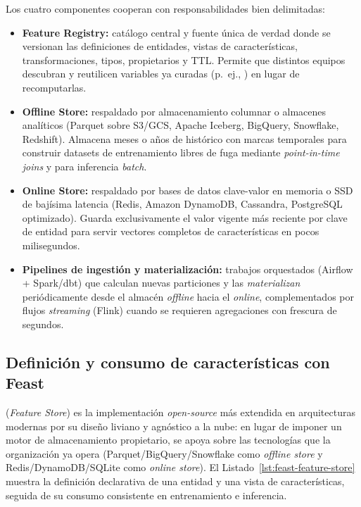 Los cuatro componentes cooperan con responsabilidades bien delimitadas:
\begin{itemize}
  \item \textbf{Feature Registry:} catálogo central y fuente única de verdad donde se versionan las definiciones de entidades, vistas de características, transformaciones, tipos, propietarios y TTL. Permite que distintos equipos descubran y reutilicen variables ya curadas (p.~ej., ) en lugar de recomputarlas.
  \item \textbf{Offline Store:} respaldado por almacenamiento columnar o almacenes analíticos (Parquet sobre S3/GCS, Apache Iceberg, BigQuery, Snowflake, Redshift). Almacena meses o años de histórico con marcas temporales para construir datasets de entrenamiento libres de fuga mediante \textit{point-in-time joins} y para inferencia \textit{batch}.
  \item \textbf{Online Store:} respaldado por bases de datos clave-valor en memoria o SSD de bajísima latencia (Redis, Amazon DynamoDB, Cassandra, PostgreSQL optimizado). Guarda exclusivamente el valor vigente más reciente por clave de entidad para servir vectores completos de características en pocos milisegundos.
  \item \textbf{Pipelines de ingestión y materialización:} trabajos orquestados (Airflow + Spark/dbt) que calculan nuevas particiones y las \textit{materializan} periódicamente desde el almacén \textit{offline} hacia el \textit{online}, complementados por flujos \textit{streaming} (Flink) cuando se requieren agregaciones con frescura de segundos.
\end{itemize}

\subsection{Definición y consumo de características con Feast}

 (\textit{Feature Store}) es la implementación \textit{open-source} más extendida en arquitecturas modernas por su diseño liviano y agnóstico a la nube: en lugar de imponer un motor de almacenamiento propietario, se apoya sobre las tecnologías que la organización ya opera (Parquet/BigQuery/Snowflake como \textit{offline store} y Redis/DynamoDB/SQLite como \textit{online store}). El Listado~\ref{lst:feast-feature-store} muestra la definición declarativa de una entidad y una vista de características, seguida de su consumo consistente en entrenamiento e inferencia.

